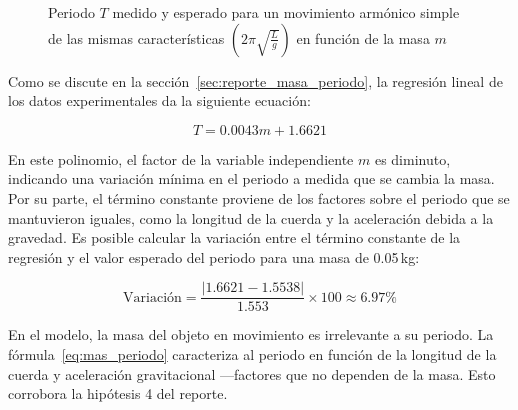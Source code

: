 \documentclass[letterpaper]{report}
\numberwithin{table}{section}
\begin{document}
\begin{figure}[h]
  \centering
  \caption{Periodo $T$ medido y esperado para un movimiento armónico
    simple de las mismas características
    $\left(2\pi\sqrt{\frac{L}{g}}\right)$ en función de la masa
  $m$}\label{fig:masa_periodo_mas}
\end{figure}

Como se discute en la sección~\ref{sec:reporte_masa_periodo}, la
regresión lineal de los datos experimentales da la siguiente ecuación:

\begin{equation}
  T = 0.0043m + 1.6621
\end{equation}

En este polinomio, el factor de la variable independiente $m$ es
diminuto, indicando una variación mínima en el periodo a medida que
se cambia la masa. Por su parte, el término constante proviene de los
factores sobre el periodo que se mantuvieron iguales, como la
longitud de la cuerda y la aceleración debida a la gravedad. Es
posible calcular la variación entre el término constante de la regresión y el
valor esperado del periodo para una masa de 0.05\,kg:

\begin{equation}
  \text{Variación} = \frac{\lvert 1.6621 - 1.5538 \rvert}{1.553}
  \times 100 \approx 6.97\%
\end{equation}

En el modelo, la masa del objeto en movimiento es irrelevante a su
periodo. La fórmula~\ref{eq:mas_periodo}
caracteriza al periodo en función de la longitud de la cuerda y
aceleración gravitacional —factores que no dependen de la masa. Esto
corrobora la hipótesis 4 del reporte.
\end{document}
